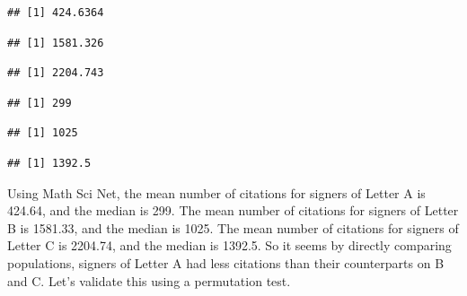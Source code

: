 \documentclass[]{article}
\begin{document}
\begin{verbatim}
## [1] 424.6364
\end{verbatim}

\begin{verbatim}
## [1] 1581.326
\end{verbatim}

\begin{verbatim}
## [1] 2204.743
\end{verbatim}

\begin{verbatim}
## [1] 299
\end{verbatim}

\begin{verbatim}
## [1] 1025
\end{verbatim}

\begin{verbatim}
## [1] 1392.5
\end{verbatim}

Using Math Sci Net, the mean number of citations for signers of Letter A
is 424.64, and the median is 299. The mean number of citations for
signers of Letter B is 1581.33, and the median is 1025. The mean number
of citations for signers of Letter C is 2204.74, and the median is
1392.5. So it seems by directly comparing populations, signers of Letter
A had less citations than their counterparts on B and C. Let's validate
this using a permutation test.
\end{document}
